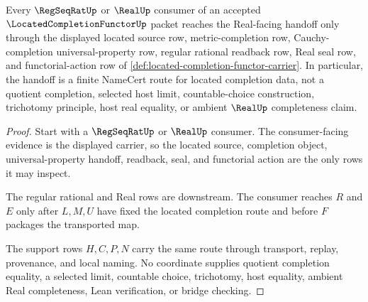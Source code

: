 \begin{theorem}
\label{thm:located-completion-functor-real-handoff}
Every $\RegSeqRatUp$ or $\RealUp$ consumer of an accepted $\LocatedCompletionFunctorUp$ packet reaches the Real-facing handoff only through the displayed located source row, metric-completion row, Cauchy-completion universal-property row, regular rational readback row, Real seal row, and functorial-action row of \autoref{def:located-completion-functor-carrier}. In particular, the handoff is a finite NameCert route for located completion data, not a quotient completion, selected host limit, countable-choice construction, trichotomy principle, host real equality, or ambient $\RealUp$ completeness claim.
\end{theorem}
\begin{proof}
Start with a $\RegSeqRatUp$ or $\RealUp$ consumer. The consumer-facing evidence is the displayed carrier, so the located source, completion object, universal-property handoff, readback, seal, and functorial action are the only rows it may inspect.

The regular rational and Real rows are downstream. The consumer reaches $R$ and $E$ only after $L,M,U$ have fixed the located completion route and before $F$ packages the transported map.

The support rows $H,C,P,N$ carry the same route through transport, replay, provenance, and local naming. No coordinate supplies quotient completion equality, a selected limit, countable choice, trichotomy, host equality, ambient Real completeness, Lean verification, or bridge checking.
\end{proof}




